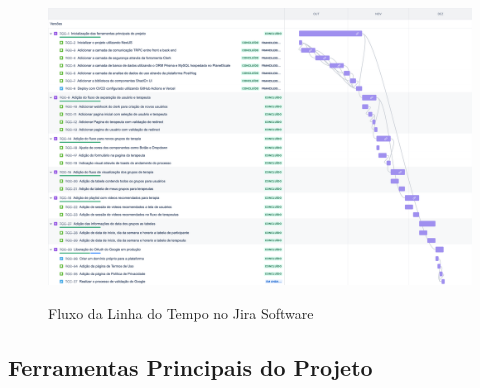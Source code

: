 \begin{figure}[!ht]
    \centering
    \includegraphics[scale=0.16]{latex/figuras/fluxojira.pdf}
    \label{fluxojira}
    \caption[Linha do Tempo do Projeto]{Fluxo da Linha do Tempo no Jira Software}
    \label{fig:enter-label}
\end{figure}\pagebreak

\pagebreak

\subsection{Ferramentas Principais do Projeto}

